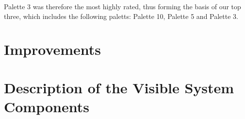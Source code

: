 Palette 3 was therefore the most highly rated, thus 
forming the basis of our top three, which includes the 
following paletts: Palette 10, Palette 5 and Palette 3.
\begin{figure}[H]
    \centerline{%
    \hfill
    \hfill
    }
\end{figure} 
\section{Improvements}
\section{Description of the Visible System Components}
